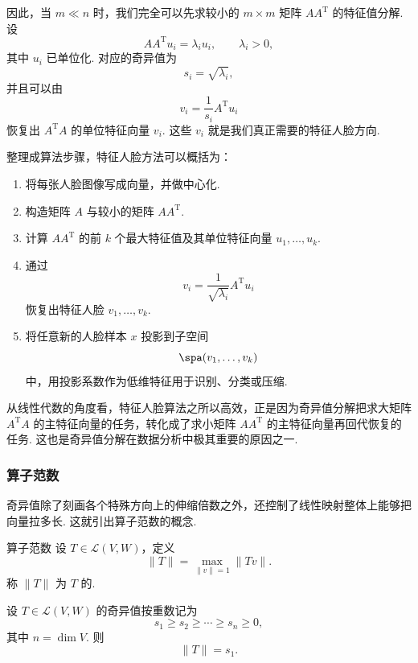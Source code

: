 因此，当 $m \ll n$ 时，我们完全可以先求较小的 $m \times m$ 矩阵 $AA^{\mathrm{T}}$ 的特征值分解. 设
\[
    AA^{\mathrm{T}}u_i = \lambda_i u_i,\qquad \lambda_i > 0,
\]
其中 $u_i$ 已单位化. 对应的奇异值为
\[
    s_i = \sqrt{\lambda_i},
\]
并且可以由
\[
    v_i = \frac{1}{s_i}A^{\mathrm{T}}u_i
\]
恢复出 $A^{\mathrm{T}}A$ 的单位特征向量 $v_i$. 这些 $v_i$ 就是我们真正需要的特征人脸方向.

整理成算法步骤，特征人脸方法可以概括为：
\begin{enumerate}
    \item 将每张人脸图像写成向量，并做中心化.

    \item 构造矩阵 $A$ 与较小的矩阵 $AA^{\mathrm{T}}$.

    \item 计算 $AA^{\mathrm{T}}$ 的前 $k$ 个最大特征值及其单位特征向量 $u_1, \ldots, u_k$.

    \item 通过
          \[
              v_i = \frac{1}{\sqrt{\lambda_i}}A^{\mathrm{T}}u_i
          \]
          恢复出特征人脸 $v_1, \ldots, v_k$.

    \item 将任意新的人脸样本 $x$ 投影到子空间
          \[
              \spa(v_1, \ldots, v_k)
          \]
          中，用投影系数作为低维特征用于识别、分类或压缩.
\end{enumerate}

从线性代数的角度看，特征人脸算法之所以高效，正是因为奇异值分解把求大矩阵 $A^{\mathrm{T}}A$ 的主特征向量的任务，转化成了求小矩阵 $AA^{\mathrm{T}}$ 的主特征向量再回代恢复的任务. 这也是奇异值分解在数据分析中极其重要的原因之一.

\subsubsection*{算子范数}

奇异值除了刻画各个特殊方向上的伸缩倍数之外，还控制了线性映射整体上能够把向量拉多长. 这就引出算子范数的概念.

\begin{definition}{算子范数}{} 
    设 $T \in \mathcal{L}(V, W)$，定义
    \[
        \lVert T \rVert = \max_{\lVert v \rVert = 1}\lVert Tv \rVert.
    \]
    称 $\lVert T \rVert$ 为 $T$ 的.
\end{definition}

\begin{theorem}{}{}
    设 $T \in \mathcal{L}(V, W)$ 的奇异值按重数记为
    \[
        s_1 \geqslant s_2 \geqslant \cdots \geqslant s_n \geqslant 0,
    \]
    其中 $n = \dim V$. 则
    \[
        \lVert T \rVert = s_1.
    \]
\end{theorem}

